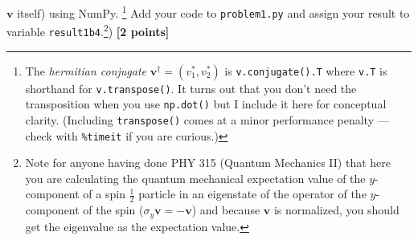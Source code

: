 \documentclass[letterpaper]{scrartcl}
\newcounter{TotalPoints}
\newcommand{\points}[1]{\textbf{[#1 points]}\stepcounter{TotalPoints}}
\newenvironment{enuma}{\begin{enumerate}[label=(\alph*)]}{\end{enumerate}}
\newenvironment{enumi}{\begin{enumerate}[label=(\roman*)]}{\end{enumerate}}
\renewcommand{\vec}[1]{\ensuremath{\mathbf{#1}}}
\begin{document}
\begin{enuma}
\begin{enumi}
    $\vec{v}$ itself) using NumPy. \footnote{The \emph{hermitian
        conjugate} $\vec{v}^{\dagger} = (v_{1}^{*}, v_{2}^{*})$ is
      \texttt{v.conjugate().T} where \texttt{v.T} is shorthand for
      \texttt{v.transpose()}. It turns out that you don't need the
      transposition when you use \texttt{np.dot()} but I include it
      here for conceptual clarity. (Including \texttt{transpose()}
      comes at a minor performance penalty --- check with
      \texttt{\%timeit} if you are curious.)}  Add your code to
    \texttt{problem1.py} and assign your result to variable
    \texttt{result1b4}.\footnote{Note for anyone having done PHY 315
      (Quantum Mechanics II) that here you are calculating the quantum
      mechanical expectation value of the $y$-component of a spin
      $\frac{1}{2}$ particle in an eigenstate of the operator of the
      $y$-component of the spin ($\sigma_{y}\vec{v} = -\vec{v}$) and
      because $\vec{v}$ is normalized, you should get the eigenvalue
      as the expectation value.})  \points{2}
    \end{enumi}
\end{enuma}
\end{document}
